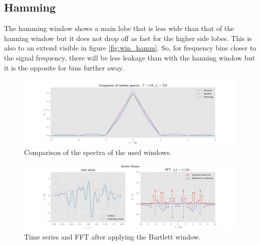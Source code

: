 \documentclass[10pt, a4paper]{article}
\begin{document}
\subsection{Hamming}
The hamming window shows a main lobe that is less wide than that of the hanning window but it does not drop off as fast for the higher side lobes. \cite{understanding_dsp} This is also to an extend visible in figure \ref{fig:win_hamm}. So, for frequency bins closer to the signal frequency, there will be less leakage than with the hanning window but it is the opposite for bins further away.


\begin{figure}[h]
  \centering
  \includegraphics[width=\textwidth]{graphics/win_spectra.pdf}
  \caption{Comparison of the spectra of the used windows.}\label{fig:win_spec_comp}
\end{figure}


\begin{figure}[H]
  \centering
  \includegraphics[width=\textwidth]{graphics/Bartlett.pdf}
  \caption{Time series and FFT after applying the Bartlett window.}\label{fig:win_bartlett}
\end{figure}
\end{document}
